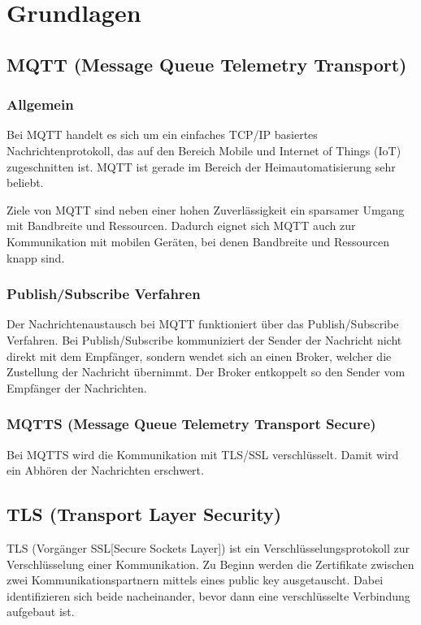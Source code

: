 \chapter{Grundlagen}
\label{cha:Grundlagen}

\section{MQTT (Message Queue Telemetry Transport)}

\subsection{Allgemein}
Bei MQTT handelt es sich um ein einfaches TCP/IP basiertes Nachrichtenprotokoll, das auf den Bereich Mobile und Internet of Things (IoT) zugeschnitten ist. MQTT ist gerade im Bereich der Heimautomatisierung sehr beliebt.

Ziele von MQTT sind neben einer hohen Zuverlässigkeit ein sparsamer Umgang mit Bandbreite und Ressourcen. Dadurch eignet sich MQTT auch zur Kommunikation mit mobilen Geräten, bei denen Bandbreite und Ressourcen knapp sind.

\subsection{Publish/Subscribe Verfahren}
Der Nachrichtenaustausch bei MQTT funktioniert über das Publish/Subscribe Verfahren. Bei Publish/Subscribe kommuniziert der Sender der Nachricht nicht direkt mit dem Empfänger, sondern wendet sich an einen Broker, welcher die Zustellung der Nachricht übernimmt. Der Broker entkoppelt so den Sender vom Empfänger der Nachrichten.

\subsection{MQTTS (Message Queue Telemetry Transport Secure)}
Bei MQTTS wird die Kommunikation mit TLS/SSL verschlüsselt. Damit wird ein Abhören der Nachrichten erschwert.

\section{TLS (Transport Layer Security)}
TLS (Vorgänger SSL[Secure Sockets Layer]) ist ein Verschlüsselungsprotokoll zur Verschlüsselung einer Kommunikation. Zu Beginn werden die Zertifikate zwischen zwei Kommunikationspartnern mittels eines public key ausgetauscht. Dabei identifizieren sich beide nacheinander, bevor dann eine verschlüsselte Verbindung aufgebaut ist.


